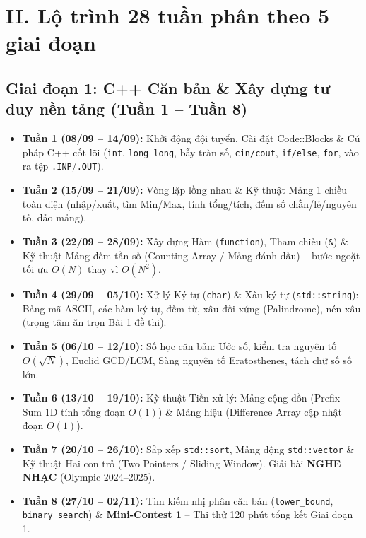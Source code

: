 \documentclass[11pt,a4paper]{article}
\begin{document}
\section*{\color{AsianDarkBlue}II. Lộ trình 28 tuần phân theo 5 giai đoạn}

\subsection*{\color{AsianBlue}Giai đoạn 1: C++ Căn bản \& Xây dựng tư duy nền tảng (Tuần 1 -- Tuần 8)}
\begin{itemize}
    \setlength{\itemsep}{1.5pt}
    \item \textbf{Tuần 1 (08/09 -- 14/09):} Khởi động đội tuyển, Cài đặt Code::Blocks \& Cú pháp C++ cốt lõi (\texttt{int}, \texttt{long long}, bẫy tràn số, \texttt{cin/cout}, \texttt{if/else}, \texttt{for}, vào ra tệp \texttt{.INP}/\texttt{.OUT}).
    \item \textbf{Tuần 2 (15/09 -- 21/09):} Vòng lặp lồng nhau \& Kỹ thuật Mảng 1 chiều toàn diện (nhập/xuất, tìm Min/Max, tính tổng/tích, đếm số chẵn/lẻ/nguyên tố, đảo mảng).
    \item \textbf{Tuần 3 (22/09 -- 28/09):} Xây dựng Hàm (\texttt{function}), Tham chiếu (\texttt{\&}) \& Kỹ thuật Mảng đếm tần số (Counting Array / Mảng đánh dấu) -- bước ngoặt tối ưu $O(N)$ thay vì $O(N^2)$.
    \item \textbf{Tuần 4 (29/09 -- 05/10):} Xử lý Ký tự (\texttt{char}) \& Xâu ký tự (\texttt{std::string}): Bảng mã ASCII, các hàm ký tự, đếm từ, xâu đối xứng (Palindrome), nén xâu (trọng tâm ăn trọn Bài 1 đề thi).
    \item \textbf{Tuần 5 (06/10 -- 12/10):} Số học căn bản: Ước số, kiểm tra nguyên tố $O(\sqrt{N})$, Euclid GCD/LCM, Sàng nguyên tố Eratosthenes, tách chữ số số lớn.
    \item \textbf{Tuần 6 (13/10 -- 19/10):} Kỹ thuật Tiền xử lý: Mảng cộng dồn (Prefix Sum 1D tính tổng đoạn $O(1)$) \& Mảng hiệu (Difference Array cập nhật đoạn $O(1)$).
    \item \textbf{Tuần 7 (20/10 -- 26/10):} Sắp xếp \texttt{std::sort}, Mảng động \texttt{std::vector} \& Kỹ thuật Hai con trỏ (Two Pointers / Sliding Window). Giải bài \textbf{NGHE NHẠC} (Olympic 2024--2025).
    \item \textbf{Tuần 8 (27/10 -- 02/11):} Tìm kiếm nhị phân căn bản (\texttt{lower\_bound}, \texttt{binary\_search}) \& \textbf{Mini-Contest 1} -- Thi thử 120 phút tổng kết Giai đoạn 1.
\end{itemize}
\end{document}
